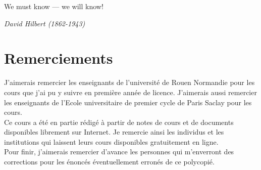 \epigraph{We must know — we will know!}{\textit{David Hilbert (1862-1943)}}


\section*{Remerciements}
J'aimerais remercier les enseignants de l'université de Rouen Normandie pour les cours que j'ai pu y suivre en première année de licence. J'aimerais aussi remercier les enseignants de l'Ecole universitaire de premier cycle de Paris Saclay pour les cours.  \\

Ce cours a été en partie rédigé à partir de notes de cours et de documents disponibles librement sur Internet. Je remercie ainsi les individus et les institutions qui laissent leurs cours disponibles gratuitement en ligne. \\


Pour finir, j'aimerais remercier d'avance les personnes qui m'enverront des corrections pour les énoncés éventuellement erronés de ce polycopié. 

















